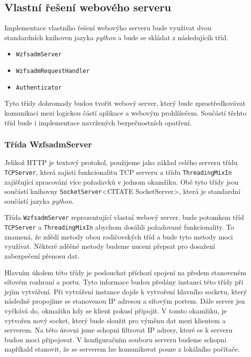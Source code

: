     \subsection{Vlastní řešení webového serveru}
    Implementace vlastního řešení webovýho serveru bude využívat dvou standardních knihoven jazyka \emph{python} a bude se skládat z následujícíh tříd.
    \begin{itemize}
      \item \verb|WzfsadmServer|
      \item \verb|WzfsadmRequestHandler|
      \item \verb|Authenticator|
    \end{itemize}

    Tyto třídy dohromady budou tvořit webový server, který bude zprostředkovávat komunikaci mezi logickou částí aplikace a webovým prohlížečem. Součástí těchto tříd bude i implementace navržených bezpečnostních opatření.
    \subsubsection{Třída WzfsadmServer}
    Jelikož HTTP je textový protokol, použijeme jako základ celého serveru  třídu \verb|TCPServer|, která zajistí funkcionalitu TCP serveru a třídu \verb|ThreadingMixIn| zajišťující zpracování více požadavků v jednom okamžiku. Obě tyto třídy jsou součástí knihovny \verb|SocketServer|<CITATE SocketServer>, která je standardní součástí jazyka \emph{python}.

    Třída \verb|WzfsadmServer| reprezentující vlastní webový server, bude potomkem tříd \verb|TCPServer| a \verb|ThreadingMixIn| abychom dosáhli požadované funkcionality. To znamená, že zdědí metody obou rodičovských tříd a bude tyto metody moci využívat. Některé zděěné metody budeme nuceni přepsat pro dosažení zabezpečení přenosu dat.

    Hlavním úkolem této třídy je poslouchat příchozí spojení na předem stanoveném síťovém rozhraní a portu. Tyto informace budou předány instanci této třídy při jejím vytváření. Při vytváření instance dojde k vytvoření hlavního socketu, který následně propojíme se stanovenou IP adresou a síťovým portem. Dále server jen vyčkává do, okmažiku kdy se klient pokusí připojit. V tomto okamžiku, je vytvořen nový socket, který bude sloužit pro výměnu dat mezi klientem a serverem. Na této úrovni jsme schopni filtrovat IP adresy, které se k serveru budou moci připojovat. V konfiguračním souboru serveru budeme schopni napříkald stanovit, že se serverem lze komunikovat pouze z lokálního počítače.

